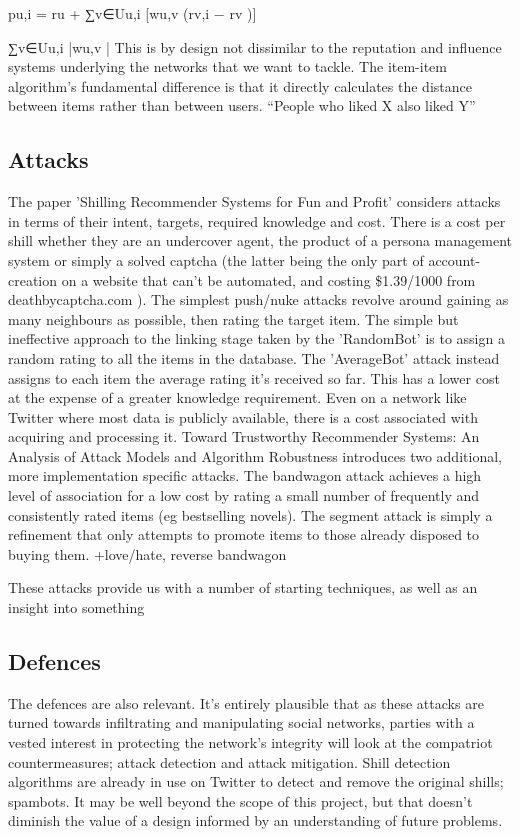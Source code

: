 pu,i = ru +       ∑v∈Uu,i [wu,v (rv,i − rv )]

∑v∈Uu,i |wu,v |
This is by design not dissimilar to the reputation and influence systems underlying the networks that we want to tackle. The item-item algorithm’s fundamental difference is that it directly calculates the distance between items rather than between users. “People who liked X also liked Y”

\subsection{Attacks}

The paper 'Shilling Recommender Systems for Fun and Profit' considers attacks in terms of their intent, targets, required knowledge and cost. There is a cost per shill whether they are an undercover agent, the product of a persona management system or simply a solved captcha (the latter being the only part of account-creation on a website that can't be automated, and costing \$1.39/1000 from deathbycaptcha.com ). The simplest push/nuke attacks revolve around gaining as many neighbours as possible, then rating the target item. The simple but ineffective approach to the linking stage taken by the 'RandomBot' is to assign a random rating to all the items in the database. The 'AverageBot' attack instead assigns to each item the average rating it's received so far. This has a lower cost at the expense of a greater knowledge requirement. Even on a network like Twitter where most data is publicly available, there is a cost associated with acquiring and processing it. Toward Trustworthy Recommender Systems: An Analysis of Attack Models and Algorithm Robustness introduces two additional, more implementation specific attacks. The bandwagon attack achieves a high level of association for a low cost by rating a small number of frequently and consistently rated items (eg bestselling novels).  The segment attack is simply a refinement that only attempts to promote items to those already disposed to buying them. +love/hate, reverse bandwagon

These attacks provide us with a number of starting techniques, as well as an insight into something

\subsection{Defences}

The defences are also relevant. It’s entirely plausible that as these attacks are turned towards infiltrating and manipulating social networks, parties with a vested interest in protecting the network’s integrity will look at the compatriot countermeasures; attack detection and attack mitigation. Shill detection algorithms are already in use on Twitter to detect and remove the original shills; spambots. It may be well beyond the scope of this project, but that doesn’t diminish the value of a design informed by an understanding of future problems.

